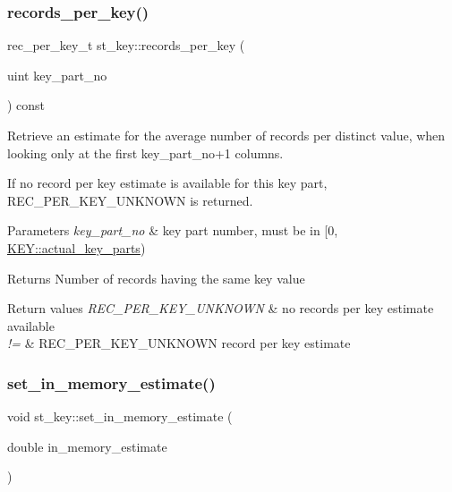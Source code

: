 \subsubsection{\texorpdfstring{records\+\_\+per\+\_\+key()}{records\_per\_key()}}
{\footnotesize\ttfamily rec\+\_\+per\+\_\+key\+\_\+t st\+\_\+key\+::records\+\_\+per\+\_\+key (\begin{DoxyParamCaption}\item[{uint}]{key\+\_\+part\+\_\+no }\end{DoxyParamCaption}) const\hspace{0.3cm}{\ttfamily [inline]}}

Retrieve an estimate for the average number of records per distinct value, when looking only at the first key\+\_\+part\+\_\+no+1 columns.

If no record per key estimate is available for this key part, R\+E\+C\+\_\+\+P\+E\+R\+\_\+\+K\+E\+Y\+\_\+\+U\+N\+K\+N\+O\+WN is returned.


\begin{DoxyParams}{Parameters}
{\em key\+\_\+part\+\_\+no} & key part number, must be in \mbox{[}0, \mbox{\hyperlink{structst__key_ae6e21b5421c8c6f5a53fc5ec3dbeea80}{K\+E\+Y\+::actual\+\_\+key\+\_\+parts}})\\
\hline
\end{DoxyParams}
\begin{DoxyReturn}{Returns}
Number of records having the same key value 
\end{DoxyReturn}

\begin{DoxyRetVals}{Return values}
{\em R\+E\+C\+\_\+\+P\+E\+R\+\_\+\+K\+E\+Y\+\_\+\+U\+N\+K\+N\+O\+WN} & no records per key estimate available \\
\hline
{\em !=} & R\+E\+C\+\_\+\+P\+E\+R\+\_\+\+K\+E\+Y\+\_\+\+U\+N\+K\+N\+O\+WN record per key estimate \\
\hline
\end{DoxyRetVals}
\mbox{\label{structst__key_afcffbcd4e79b07f12e8c0ffd0ac13c67}} 
\subsubsection{\texorpdfstring{set\+\_\+in\+\_\+memory\+\_\+estimate()}{set\_in\_memory\_estimate()}}
{\footnotesize\ttfamily void st\+\_\+key\+::set\+\_\+in\+\_\+memory\+\_\+estimate (\begin{DoxyParamCaption}\item[{double}]{in\+\_\+memory\+\_\+estimate }\end{DoxyParamCaption})\hspace{0.3cm}{\ttfamily [inline]}}

